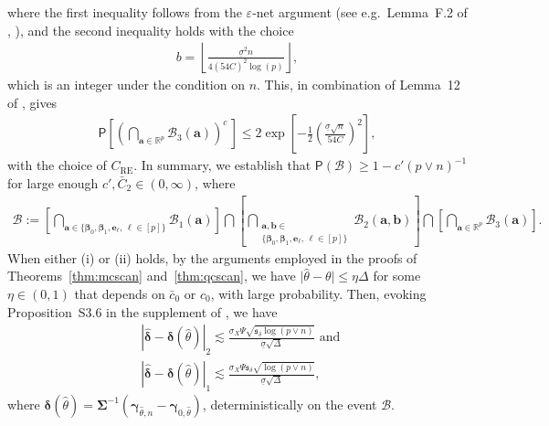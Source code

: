 \documentclass[11pt, a4paper]{article}
\newcommand{\mbf}{\mathbf}
\newcommand{\mc}{\mathcal}
\renewcommand{\l}{\left}
\renewcommand{\r}{\right}
\def\wh{\widehat}
\newcommand{\cp}{\theta}
\newcommand{\p}{\mathsf{P}}
\newcommand{\R}{\mathbb{R}}
\theoremstyle{definition}
\theoremstyle{definition}
\theoremstyle{definition}
\theoremstyle{definition}
\theoremstyle{definition}
\theoremstyle{remark}
\theoremstyle{definition}
\theoremstyle{definition}
\theoremstyle{definition}
\begin{document}
where the first inequality follows from the $\varepsilon$-net argument (see e.g.\ Lemma~F.2 of \citeauthor{basu2015regularized}, \citeyear{basu2015regularized}), and the second inequality holds with the choice
\begin{align*}
b = \l\lfloor \frac{\underline{\sigma}^2 n}{4 (54 C)^2 \log(p)} \r\rfloor,
\end{align*}
which is an integer under the condition on $n$.
This, in combination of Lemma~12 of \cite{loh2012high}, gives
\begin{align*}
\p\l[ \l( \bigcap_{\mbf a \in \R^p} \mc B_3(\mbf a) \r)^c \, \r] \le 2 \exp\l[ - \frac{1}{2} \l( \frac{\underline{\sigma}\sqrt{n}}{54C} \r)^2 \r],
\end{align*}
with the choice of $C_{\text{RE}}$.
In summary, we establish that $\p(\mc B) \ge 1 - c' (p \vee n)^{-1}$ for large enough $c', \bar{C}_2 \in (0, \infty)$, where
\begin{align}
\label{eq:set:b}
\mc B := \l[ \bigcap_{\mbf a \in \{\bm\beta_0, \bm\beta_1, \mbf e_\ell, \, \ell \in [p] \}} \mc B_1(\mbf a) \r] \bigcap \l[ \bigcap_{\substack{\mbf a, \mbf b \in \\ \{\bm\beta_0, \bm\beta_1, \mbf e_\ell, \, \ell \in [p]\}}} \mc B_2(\mbf a, \mbf b) \r]  \bigcap \l[ \bigcap_{\mbf a \in \R^p} \mc B_3(\mbf a) \r] .
\end{align}
When either (i) or (ii) holds, by the arguments employed in the proofs of Theorems~\ref{thm:mcscan} and~\ref{thm:qcscan}, we have $\vert \wh\cp - \cp \vert \le \eta \Delta$ for some $\eta \in (0, 1)$ that depends on $\bar{c}_0$ or $c_0$, with large probability.
Then, evoking Proposition~S3.6 in the supplement of \cite{cho2024detection}, we have
\begin{align*}
& \l\vert \wh{\bm\delta} - \bm\delta(\wh\cp) \r\vert_2 \lesssim \frac{\sigma_X \Psi \sqrt{\mathfrak{s}_\delta \log(p \vee n)}}{\underline{\sigma} \sqrt{\Delta}}
\text{ \ and \ }
\\
& \l\vert \wh{\bm\delta} - \bm\delta(\wh\cp) \r\vert_1 \lesssim \frac{\sigma_X \Psi \mathfrak{s}_\delta \sqrt{\log(p \vee n)}}{\underline{\sigma} \sqrt{\Delta}},
\end{align*}
where $\bm\delta(\wh\cp) = \bm\Sigma^{-1} (\bm\gamma_{\wh\cp, n} - \bm\gamma_{0, \wh\cp})$, deterministically on the event $\mc B$.
\end{document}
